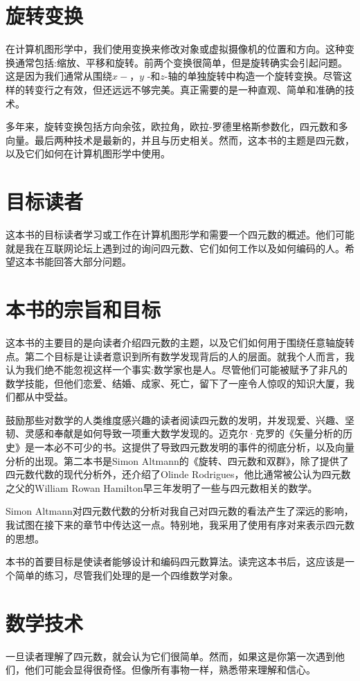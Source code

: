 
\section{旋转变换}
在计算机图形学中，我们使用变换来修改对象或虚拟摄像机的位置和方向。这种变换通常包括:缩放、平移和旋转。前两个变换很简单，但是旋转确实会引起问题。这是因为我们通常从围绕$x-， y$ -和$z$-轴的单独旋转中构造一个旋转变换。尽管这样的转变行之有效，但还远远不够完美。真正需要的是一种直观、简单和准确的技术。

多年来，旋转变换包括方向余弦，欧拉角，欧拉-罗德里格斯参数化，四元数和多向量。最后两种技术是最新的，并且与历史相关。然而，这本书的主题是四元数，以及它们如何在计算机图形学中使用。


\section{目标读者}
这本书的目标读者学习或工作在计算机图形学和需要一个四元数的概述。他们可能就是我在互联网论坛上遇到过的询问四元数、它们如何工作以及如何编码的人。希望这本书能回答大部分问题。


\section{本书的宗旨和目标}
这本书的主要目的是向读者介绍四元数的主题，以及它们如何用于围绕任意轴旋转点。第二个目标是让读者意识到所有数学发现背后的人的层面。就我个人而言，我认为我们绝不能忽视这样一个事实:数学家也是人。尽管他们可能被赋予了非凡的数学技能，但他们恋爱、结婚、成家、死亡，留下了一座令人惊叹的知识大厦，我们都从中受益。

鼓励那些对数学的人类维度感兴趣的读者阅读四元数的发明，并发现爱、兴趣、坚韧、灵感和奉献是如何导致一项重大数学发现的。迈克尔·克罗的《矢量分析的历史》\cite{bib1-1}是一本必不可少的书。这提供了导致四元数发明的事件的彻底分析，以及向量分析的出现。第二本书是Simon Altmann的《旋转、四元数和双群\cite{bib1-2}》，除了提供了四元数代数的现代分析外，还介绍了Olinde Rodrigues，他比通常被公认为四元数之父的William Rowan Hamilton早三年发明了一些与四元数相关的数学。

Simon Altmann对四元数代数的分析对我自己对四元数的看法产生了深远的影响，我试图在接下来的章节中传达这一点。特别地，我采用了使用有序对来表示四元数的思想。

本书的首要目标是使读者能够设计和编码四元数算法。读完这本书后，这应该是一个简单的练习，尽管我们处理的是一个四维数学对象。

\section{数学技术}
一旦读者理解了四元数，就会认为它们很简单。然而，如果这是你第一次遇到他们，他们可能会显得很奇怪。但像所有事物一样，熟悉带来理解和信心。


